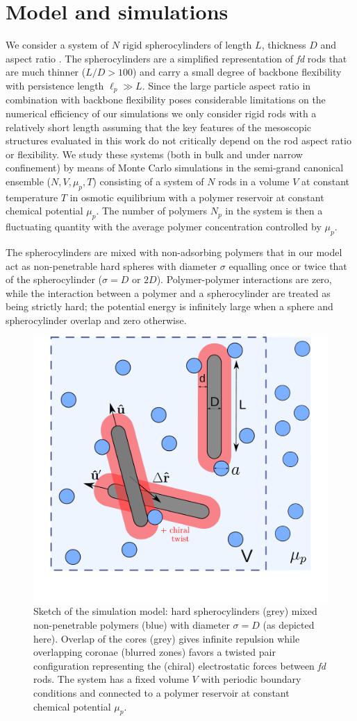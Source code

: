 \section{Model and simulations}

We consider a system of $N$ rigid spherocylinders of length $L$, thickness $D$ and aspect ratio . The spherocylinders are a simplified representation of {\em fd} rods that are much thinner ($L/D > 100$) and carry a small degree of backbone flexibility with persistence length $\ell_{p} \gg L$. Since the large particle aspect ratio in combination with backbone flexibility poses considerable limitations on the numerical efficiency of our simulations  we  only consider rigid rods with a relatively short length assuming that the key features of the mesoscopic structures evaluated in this work do not  critically depend on the rod aspect ratio or flexibility. We study these systems (both in bulk and under narrow confinement) by means of Monte Carlo simulations in the semi-grand canonical ensemble ($N,V,\mu_{p},T$) consisting of a system of $N$ rods in a volume $V$ at constant temperature $T$ in osmotic equilibrium with a polymer reservoir at constant chemical potential $\mu_{p}$. The number of polymers  $N_{p}$ in the system is then a fluctuating quantity with the average polymer concentration controlled by $\mu_{p}$.


The spherocylinders are mixed with non-adsorbing polymers that in our model act as non-penetrable hard spheres with diameter $\sigma$ equalling once or twice that of the spherocylinder ($\sigma = D$ or $2D$). Polymer-polymer interactions are zero, while the interaction between a polymer and a spherocylinder are treated as being strictly hard;  the potential energy is infinitely large when a  sphere and spherocylinder overlap and zero otherwise.



\begin{figure}
	\includegraphics[width = 0.6\columnwidth]{figures/chapter-5/spheromans}
	\caption{ Sketch of the simulation model: hard spherocylinders (grey) mixed non-penetrable polymers (blue) with diameter $\sigma = D$ (as depicted here). Overlap of the cores (grey) gives infinite repulsion while overlapping coronae (blurred zones) favors a twisted pair configuration representing the (chiral) electrostatic forces between {\em fd} rods. The system has a fixed volume $V$ with periodic boundary conditions and connected to a polymer reservoir at constant chemical potential $\mu_p$. }
	\label{sketch}
\end{figure}


